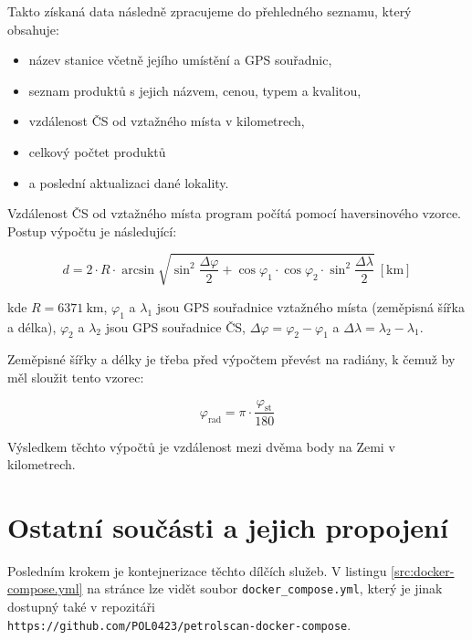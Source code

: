 Takto získaná data následně zpracujeme do přehledného seznamu, který obsahuje:

\begin{itemize}
    \item název stanice včetně jejího umístění a GPS souřadnic,
    \item seznam produktů s jejich názvem, cenou, typem a kvalitou,
    \item vzdálenost ČS od vztažného místa v kilometrech,
    \item celkový počtet produktů
    \item a poslední aktualizaci dané lokality.
\end{itemize}

Vzdálenost ČS od vztažného místa program počítá pomocí haversinového vzorce.
Postup výpočtu je následující:

\begin{equation}
    \label{eq:haversine-formula}
        d   =   2 \cdot R \cdot \arcsin \sqrt{
                    \sin^2 \frac{\Delta\varphi}{2} +
                    \cos \varphi_1 \cdot \cos \varphi_2 \cdot
                    \sin^2 \frac{\Delta\lambda}{2}
                }~[\text{km}]
\end{equation}

kde \(R = 6371~\text{km}\), \(\varphi_1\) a \(\lambda_1\) jsou GPS souřadnice
vztažného místa (zeměpisná šířka a délka), \(\varphi_2\) a \(\lambda_2\)
jsou GPS souřadnice ČS, \(\Delta\varphi = \varphi_2 - \varphi_1\)
a \(\Delta\lambda = \lambda_2 - \lambda_1\).

Zeměpisné šířky a délky je třeba před výpočtem převést na radiány, k čemuž
by měl sloužit tento vzorec:

\begin{equation}
    \label{eq:deg-to-rad}
    \varphi_{\text{rad}} = \pi \cdot \frac{\varphi_{\text{st}}}{180}
\end{equation}

Výsledkem těchto výpočtů je vzdálenost mezi dvěma body na Zemi v kilometrech.

\section{Ostatní součásti a jejich propojení}

Posledním krokem je kontejnerizace těchto dílčích služeb. V listingu
\ref{src:docker-compose.yml} na stránce \pageref{src:docker-compose.yml}
lze vidět soubor \texttt{docker\_compose.yml}, který je jinak dostupný
také v repozitáři\\
\texttt{https://github.com/POL0423/petrolscan-docker-compose}.

